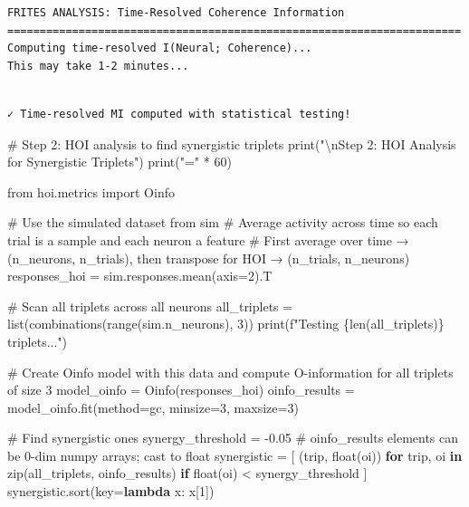 \documentclass[
  11pt,
  letterpaper,
  oneside,
  openany]{book}
\newenvironment{Shaded}{\begin{snugshade}}{\end{snugshade}}
\newcommand{\BuiltInTok}[1]{\textcolor[rgb]{0.00,0.23,0.31}{#1}}
\newcommand{\CharTok}[1]{\textcolor[rgb]{0.13,0.47,0.30}{#1}}
\newcommand{\CommentTok}[1]{\textcolor[rgb]{0.37,0.37,0.37}{#1}}
\newcommand{\ControlFlowTok}[1]{\textcolor[rgb]{0.00,0.23,0.31}{\textbf{#1}}}
\newcommand{\DecValTok}[1]{\textcolor[rgb]{0.68,0.00,0.00}{#1}}
\newcommand{\FloatTok}[1]{\textcolor[rgb]{0.68,0.00,0.00}{#1}}
\newcommand{\ImportTok}[1]{\textcolor[rgb]{0.00,0.46,0.62}{#1}}
\newcommand{\KeywordTok}[1]{\textcolor[rgb]{0.00,0.23,0.31}{\textbf{#1}}}
\newcommand{\NormalTok}[1]{\textcolor[rgb]{0.00,0.23,0.31}{#1}}
\newcommand{\OperatorTok}[1]{\textcolor[rgb]{0.37,0.37,0.37}{#1}}
\newcommand{\SpecialCharTok}[1]{\textcolor[rgb]{0.37,0.37,0.37}{#1}}
\newcommand{\SpecialStringTok}[1]{\textcolor[rgb]{0.13,0.47,0.30}{#1}}
\newcommand{\StringTok}[1]{\textcolor[rgb]{0.13,0.47,0.30}{#1}}
\begin{document}
\begin{verbatim}
FRITES ANALYSIS: Time-Resolved Coherence Information
======================================================================
Computing time-resolved I(Neural; Coherence)...
This may take 1-2 minutes...
\end{verbatim}

\begin{verbatim}

✓ Time-resolved MI computed with statistical testing!
\end{verbatim}

\begin{Shaded}
\begin{Highlighting}[]
\CommentTok{\# Step 2: HOI analysis to find synergistic triplets}
\BuiltInTok{print}\NormalTok{(}\StringTok{"}\CharTok{\textbackslash{}n}\StringTok{Step 2: HOI Analysis for Synergistic Triplets"}\NormalTok{)}
\BuiltInTok{print}\NormalTok{(}\StringTok{"="} \OperatorTok{*} \DecValTok{60}\NormalTok{)}

\ImportTok{from}\NormalTok{ hoi.metrics }\ImportTok{import}\NormalTok{ Oinfo}

\CommentTok{\# Use the simulated dataset from \textasciigrave{}sim\textasciigrave{}}
\CommentTok{\# Average activity across time so each trial is a sample and each neuron a feature}
\CommentTok{\# First average over time → (n\_neurons, n\_trials), then transpose for HOI → (n\_trials, n\_neurons)}
\NormalTok{responses\_hoi }\OperatorTok{=}\NormalTok{ sim.responses.mean(axis}\OperatorTok{=}\DecValTok{2}\NormalTok{).T}

\CommentTok{\# Scan all triplets across all neurons}
\NormalTok{all\_triplets }\OperatorTok{=} \BuiltInTok{list}\NormalTok{(combinations(}\BuiltInTok{range}\NormalTok{(sim.n\_neurons), }\DecValTok{3}\NormalTok{))}
\BuiltInTok{print}\NormalTok{(}\SpecialStringTok{f"Testing }\SpecialCharTok{\{}\BuiltInTok{len}\NormalTok{(all\_triplets)}\SpecialCharTok{\}}\SpecialStringTok{ triplets..."}\NormalTok{)}

\CommentTok{\# Create Oinfo model with this data and compute O{-}information for all triplets of size 3}
\NormalTok{model\_oinfo }\OperatorTok{=}\NormalTok{ Oinfo(responses\_hoi)}
\NormalTok{oinfo\_results }\OperatorTok{=}\NormalTok{ model\_oinfo.fit(method}\OperatorTok{=}\StringTok{\textquotesingle{}gc\textquotesingle{}}\NormalTok{, minsize}\OperatorTok{=}\DecValTok{3}\NormalTok{, maxsize}\OperatorTok{=}\DecValTok{3}\NormalTok{)}

\CommentTok{\# Find synergistic ones}
\NormalTok{synergy\_threshold }\OperatorTok{=} \OperatorTok{{-}}\FloatTok{0.05}
\CommentTok{\# oinfo\_results elements can be 0{-}dim numpy arrays; cast to float}
\NormalTok{synergistic }\OperatorTok{=}\NormalTok{ [}
\NormalTok{    (trip, }\BuiltInTok{float}\NormalTok{(oi))}
    \ControlFlowTok{for}\NormalTok{ trip, oi }\KeywordTok{in} \BuiltInTok{zip}\NormalTok{(all\_triplets, oinfo\_results)}
    \ControlFlowTok{if} \BuiltInTok{float}\NormalTok{(oi) }\OperatorTok{\textless{}}\NormalTok{ synergy\_threshold}
\NormalTok{]}
\NormalTok{synergistic.sort(key}\OperatorTok{=}\KeywordTok{lambda}\NormalTok{ x: x[}\DecValTok{1}\NormalTok{])}


\end{Highlighting}
\end{Shaded}
\end{document}
